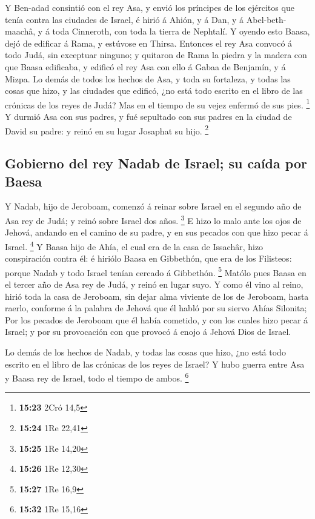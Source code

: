  Y Ben-adad consintió con el rey Asa, y envió los
príncipes de los ejércitos que tenía contra las ciudades de Israel, é
hirió á Ahión, y á Dan, y á Abel-beth-maachâ, y á toda Cinneroth, con
toda la tierra de Nephtalí.  Y oyendo esto Baasa, dejó de
edificar á Rama, y estúvose en Thirsa.  Entonces el rey
Asa convocó á todo Judá, sin exceptuar ninguno; y quitaron de Rama la
piedra y la madera con que Baasa edificaba, y edificó el rey Asa con
ello á Gabaa de Benjamín, y á Mizpa.  Lo demás de todos
los hechos de Asa, y toda su fortaleza, y todas las cosas que hizo, y
las ciudades que edificó, ¿no está todo escrito en el libro de las
crónicas de los reyes de Judá? Mas en el tiempo de su vejez enfermó de
sus pies. \footnote{\textbf{15:23} 2Cró 14,5}  Y durmió
Asa con sus padres, y fué sepultado con sus padres en la ciudad de David
su padre: y reinó en su lugar Josaphat su hijo. \footnote{\textbf{15:24}
  1Re 22,41}

\hypertarget{gobierno-del-rey-nadab-de-israel-su-cauxedda-por-baesa}{%
\subsection{Gobierno del rey Nadab de Israel; su caída por
Baesa}\label{gobierno-del-rey-nadab-de-israel-su-cauxedda-por-baesa}}

 Y Nadab, hijo de Jeroboam, comenzó á reinar sobre Israel
en el segundo año de Asa rey de Judá; y reinó sobre Israel dos años.
\footnote{\textbf{15:25} 1Re 14,20}  E hizo lo malo ante
los ojos de Jehová, andando en el camino de su padre, y en sus pecados
con que hizo pecar á Israel. \footnote{\textbf{15:26} 1Re 12,30}
 Y Baasa hijo de Ahía, el cual era de la casa de
Issachâr, hizo conspiración contra él: é hiriólo Baasa en Gibbethón, que
era de los Filisteos: porque Nadab y todo Israel tenían cercado á
Gibbethón. \footnote{\textbf{15:27} 1Re 16,9}  Matólo
pues Baasa en el tercer año de Asa rey de Judá, y reinó en lugar suyo.
 Y como él vino al reino, hirió toda la casa de Jeroboam,
sin dejar alma viviente de los de Jeroboam, hasta raerlo, conforme á la
palabra de Jehová que él habló por su siervo Ahías Silonita;
 Por los pecados de Jeroboam que él había cometido, y con
los cuales hizo pecar á Israel; y por su provocación con que provocó á
enojo á Jehová Dios de Israel.

 Lo demás de los hechos de Nadab, y todas las cosas que
hizo, ¿no está todo escrito en el libro de las crónicas de los reyes de
Israel?  Y hubo guerra entre Asa y Baasa rey de Israel,
todo el tiempo de ambos. \footnote{\textbf{15:32} 1Re 15,16}

